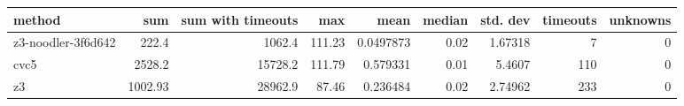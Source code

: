 \begin{tabular}{lrrrrrrrr}
\hline
 method             &     sum &   sum with timeouts &    max &      mean &   median &   std. dev &   timeouts &   unknowns \\
\hline
 z3-noodler-3f6d642 &  222.4  &              1062.4 & 111.23 & 0.0497873 &     0.02 &    1.67318 &          7 &          0 \\
 cvc5               & 2528.2  &             15728.2 & 111.79 & 0.579331  &     0.01 &    5.4607  &        110 &          0 \\
 z3                 & 1002.93 &             28962.9 &  87.46 & 0.236484  &     0.02 &    2.74962 &        233 &          0 \\
\hline
\end{tabular}
